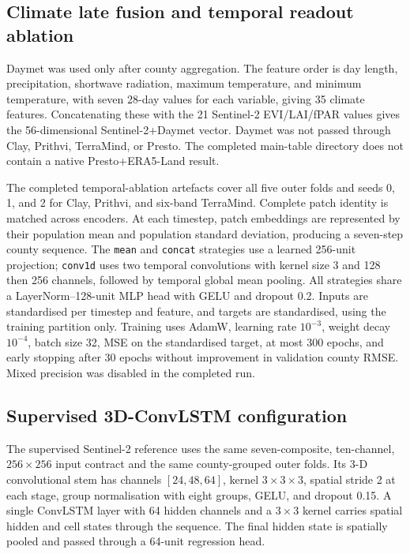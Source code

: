 \subsection{Climate late fusion and temporal readout ablation}

Daymet was used only after county aggregation.  The feature order is day
length, precipitation, shortwave radiation, maximum temperature, and minimum
temperature, with seven 28-day values for each variable, giving 35 climate
features.  Concatenating these with the 21 Sentinel-2 EVI/LAI/fPAR values gives
the 56-dimensional Sentinel-2+Daymet vector.  Daymet was not passed through
Clay, Prithvi, TerraMind, or Presto.  The completed main-table directory does
not contain a native Presto+ERA5-Land result.

The completed temporal-ablation artefacts cover all five outer folds and seeds
0, 1, and 2 for Clay, Prithvi, and six-band TerraMind.  Complete patch identity
is matched across encoders.  At each timestep, patch embeddings are represented
by their population mean and population standard deviation, producing a
seven-step county sequence.  The \texttt{mean} and \texttt{concat} strategies
use a learned 256-unit projection; \texttt{conv1d} uses two temporal
convolutions with kernel size 3 and 128 then 256 channels, followed by temporal
global mean pooling.  All strategies share a LayerNorm--128-unit MLP head with
GELU and dropout 0.2.  Inputs are standardised per timestep and feature, and
targets are standardised, using the training partition only.  Training uses
AdamW, learning rate $10^{-3}$, weight decay $10^{-4}$, batch size 32, MSE on
the standardised target, at most 300 epochs, and early stopping after 30 epochs
without improvement in validation county RMSE.  Mixed precision was disabled
in the completed run.

\subsection{Supervised 3D-ConvLSTM configuration}

The supervised Sentinel-2 reference uses the same seven-composite,
ten-channel, $256\times256$ input contract and the same county-grouped outer
folds.  Its 3-D convolutional stem has channels $[24,48,64]$, kernel
$3\times3\times3$, spatial stride 2 at each stage, group normalisation with
eight groups, GELU, and dropout 0.15.  A single ConvLSTM layer with 64 hidden
channels and a $3\times3$ kernel carries spatial hidden and cell states through
the sequence.  The final hidden state is spatially pooled and passed through a
64-unit regression head.

